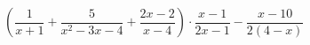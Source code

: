 \begin{ex}[type=expression]
	\begin{condition}
		\( \left( \dfrac{1}{x+1}+\dfrac{5}{x^2-3x-4}+\dfrac{2x-2}{x-4} \right) \cdot\dfrac{x-1}{2x-1}-\dfrac{x-10}{2(4-x)}\)
	\end{condition}
\end{ex}